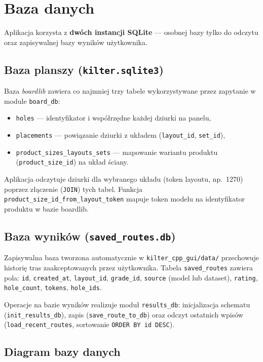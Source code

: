 \documentclass[fleqn,onecolumn,a4paper,12pt,titlepage]{article}
\begin{document}
\section*{Baza danych}

Aplikacja korzysta z \textbf{dwóch instancji SQLite} --- osobnej bazy tylko do odczytu
oraz zapisywalnej bazy wyników użytkownika.

\subsection*{Baza planszy (\texttt{kilter.sqlite3})}

Baza \emph{boardlib} zawiera co najmniej trzy tabele wykorzystywane przez zapytanie
w module \texttt{board\_db}:
\begin{itemize}[leftmargin=1.5em]
    \item \texttt{holes} --- identyfikator i współrzędne każdej dziurki na panelu,
    \item \texttt{placements} --- powiązanie dziurki z układem (\texttt{layout\_id}, \texttt{set\_id}),
    \item \texttt{product\_sizes\_layouts\_sets} --- mapowanie wariantu produktu
          (\texttt{product\_size\_id}) na układ ściany.
\end{itemize}
Aplikacja odczytuje dziurki dla wybranego układu (token layoutu, np.\ 1270) poprzez
złączenie (\texttt{JOIN}) tych tabel. Funkcja \texttt{product\_size\_id\_from\_layout\_token}
mapuje token modelu na identyfikator produktu w bazie boardlib.

\subsection*{Baza wyników (\texttt{saved\_routes.db})}

Zapisywalna baza tworzona automatycznie w \texttt{kilter\_cpp\_gui/data/} przechowuje
historię tras zaakceptowanych przez użytkownika. Tabela \texttt{saved\_routes} zawiera
pola: \texttt{id}, \texttt{created\_at}, \texttt{layout\_id}, \texttt{grade\_id},
\texttt{source} (model lub dataset), \texttt{rating}, \texttt{hole\_count},
\texttt{tokens}, \texttt{hole\_ids}.

Operacje na bazie wyników realizuje moduł \texttt{results\_db}:
inicjalizacja schematu (\texttt{init\_results\_db}), zapis (\texttt{save\_route\_to\_db})
oraz odczyt ostatnich wpisów (\texttt{load\_recent\_routes}, sortowanie
\texttt{ORDER BY id DESC}).

\subsection*{Diagram bazy danych}
\end{document}
